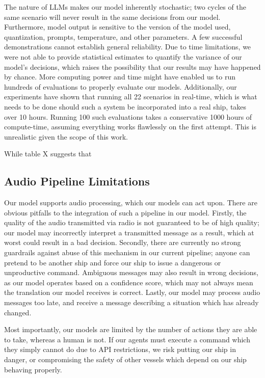 \documentclass[10pt]{reportMaster}
\begin{document}
The nature of LLMs makes our model inherently stochastic; two cycles of the same scenario will never result in the same decisions from our model. Furthermore, model output is sensitive to the version of the model used, quantization, prompts, temperature, and other parameters. A few successful demonstrations cannot establish general reliability. Due to time limitations, we were not able to provide statistical estimates to quantify the variance of our model's decisions, which raises the possibility that our results may have happened by chance. More computing power and time might have enabled us to run hundreds of evaluations to properly evaluate our models. Additionally, our experiments have shown that running all 22 scenarios in real-time, which is what needs to be done should such a system be incorporated into a real ship, takes over 10 hours. Running 100 such evaluations takes a conservative 1000 hours of compute-time, assuming everything works flawlessly on the first attempt. This is unrealistic given the scope of this work.

While table X suggests that 

\subsection{Audio Pipeline Limitations}

Our model supports audio processing, which our models can act upon. There are obvious pitfalls to the integration of such a pipeline in our model. Firstly, the quality of the audio transmitted via radio is not guaranteed to be of high quality; our model may incorrectly interpret a transmitted message as a result, which at worst could result in a bad decision. Secondly, there are currently no strong guardrails against abuse of this mechanism in our current pipeline; anyone can pretend to be another ship and force our ship to issue a dangerous or unproductive command. Ambiguous messages may also result in wrong decisions, as our model operates based on a confidence score, which may not always mean the translation our model receives is correct. Lastly, our model may process audio messages too late, and receive a message describing a situation which has already changed.

Most importantly, our models are limited by the number of actions they are able to take, whereas a human is not. If our agents must execute a command which they simply cannot do due to API restrictions, we risk putting our ship in danger, or compromising the safety of other vessels which depend on our ship behaving properly. 
\end{document}
